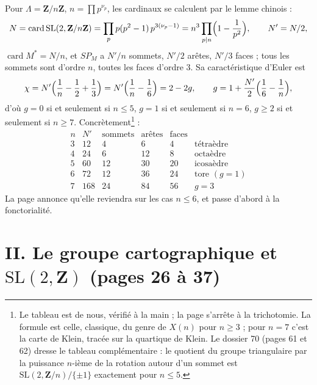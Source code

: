 \documentclass[11pt,a4paper]{article}
\begin{document}
Pour $\Lambda = \mathbf{Z}/n\mathbf{Z}$, $n = \prod p^{\nu_p}$, les cardinaux se
calculent par le lemme chinois :
\[
  N = \operatorname{card}\mathrm{SL}(2, \mathbf{Z}/n\mathbf{Z}) = \prod_p
  p(p^2 - 1)\,p^{3(\nu_p - 1)} = n^3 \prod_{p \mid n}\Bigl(1 -
  \frac{1}{p^2}\Bigr), \qquad N' = N/2 ,
\]
$\operatorname{card} M^{*} = N/n$, et $SP_M$ a $N'/n$ sommets, $N'/2$ arêtes,
$N'/3$ faces ; tous les sommets sont d'ordre $n$, toutes les faces d'ordre $3$.
Sa caractéristique d'Euler est
\[
  \chi = N'\Bigl(\frac{1}{n} - \frac{1}{2} + \frac{1}{3}\Bigr) = N'\Bigl(\frac{1}{n}
  - \frac{1}{6}\Bigr) = 2 - 2g , \qquad
  g = 1 + \frac{N'}{2}\Bigl(\frac{1}{6} - \frac{1}{n}\Bigr) ,
\]
d'où $g = 0$ si et seulement si $n \leq 5$, $g = 1$ si et seulement si $n = 6$,
$g \geq 2$ si et seulement si $n \geq 7$. Concrètement\footnote{Le tableau est
de nous, vérifié à la main ; la page s'arrête à la trichotomie. La formule est
celle, classique, du genre de $X(n)$ pour $n \geq 3$ ; pour $n = 7$ c'est la
carte de Klein, tracée sur la quartique de Klein. Le dossier 70 (pages 61 et
62) dresse le tableau complémentaire : le quotient du groupe triangulaire par
la puissance $n$-ième de la rotation autour d'un sommet est
$\mathrm{SL}(2, \mathbf{Z}/n)/\{\pm 1\}$ exactement pour $n \leq 5$.} :
\[
\begin{array}{c|cccc|l}
  n & N' & \text{sommets} & \text{arêtes} & \text{faces} & \\ \hline
  3 & 12 & 4 & 6 & 4 & \text{tétraèdre} \\
  4 & 24 & 6 & 12 & 8 & \text{octaèdre} \\
  5 & 60 & 12 & 30 & 20 & \text{icosaèdre} \\
  6 & 72 & 12 & 36 & 24 & \text{tore } (g = 1) \\
  7 & 168 & 24 & 84 & 56 & g = 3
\end{array}
\]
La page annonce qu'elle reviendra sur les cas $n \leq 6$, et passe d'abord à
la fonctorialité.

\section*{II. Le groupe cartographique et $\mathrm{SL}(2, \mathbf{Z})$ (pages 26 à 37)}
\end{document}
